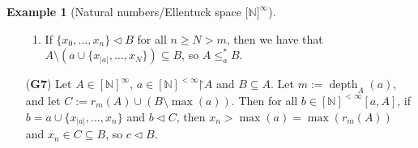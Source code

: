 \documentclass[11pt,reqno]{amsart}
\theoremstyle{plain}
\numberwithin{equation}{section}
\theoremstyle{definition}
\newtheorem{example}[theorem]{Example}
\newcommand{\func}{\operatorname}
\newcommand{\N}{\mathbb{N}}
\newcommand{\restrictedto}{\mathord{\upharpoonright}}
\newcommand{\depth}{\func{depth}}
\begin{document}
\begin{example}[Natural numbers/Ellentuck space $\lbrack \N\rbrack^\infty$]
\begin{enumerate}
\begin{enumerate}[label=(\arabic*)]
            \item If $\{x_0,\dots,x_n\} \lhd B$ for all $n \geq N > m$, then we have that $A \setminus (a \cup \{x_{|a|},\dots,x_N\}) \subseteq B$, so $A \leq_a^* B$.
        \end{enumerate}

        \item[(\textbf{G7})] Let $A \in [\N]^\infty$, $a \in [\N]^{<\infty}\restrictedto A$ and $B \subseteq A$. Let $m := \depth_A(a)$, and let $C := r_m(A) \cup (B \setminus \max(a))$. Then for all $b \in [\N]^{<\infty}[a,A]$, if $b = a \cup \{x_{|a|},\dots,x_n\}$ and $b \lhd C$, then $x_n > \max(a) = \max(r_m(A))$ and $x_n \in C \subseteq B$, so $c \lhd B$.
    \end{enumerate}
\end{example}
\end{document}

